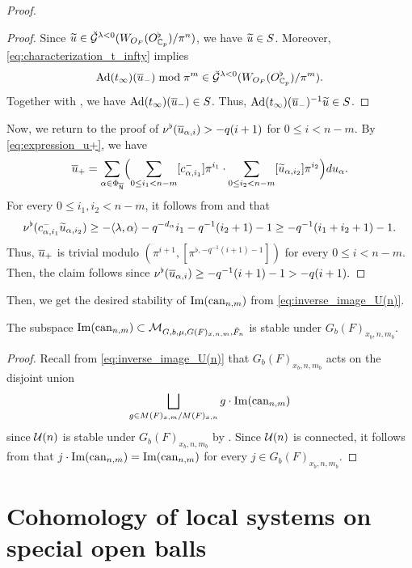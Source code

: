 \documentclass[12pt,reqno]{amsart}
\begin{document}
\begin{proof}
\begin{proof}
    Since ${\widetilde{u}} \in {\mathcal{\breve{G}}}^{\lambda < 0}(W_{O_F}(O_{\mathbb{C}_p}^\flat) / \pi^n)$, we have ${\widetilde{u}} \in S$. Moreover, \eqref{eq:characterization_t_infty} implies 
    \[
        {\operatorname{Ad}}(t_\infty)({\overline{u}}_-) \bmod \pi^m \in \breve{{\mathcal{G}}}^{\lambda < 0}(W_{O_F}(O_{\mathbb{C}_p}^\flat) / \pi^m). 
    \]
    Together with , we have ${\operatorname{Ad}}(t_\infty)({\overline{u}}_-) \in S$. Thus, ${\operatorname{Ad}}(t_\infty)({\overline{u}}_-)^{-1} {\widetilde{u}} \in S$. 
\end{proof}

    Now, we return to the proof of $\nu^\flat({\overline{u}}_{\alpha, i}) > -q(i+1)$ for $0 \leq i < n - m$. 
    By \eqref{eq:expression_u+}, we have    
    \[
        {\overline{u}}_+ = \sum_{\alpha \in \Phi_{{\mathsf{{\overline{N}}}}}} \Bigl(\sum_{0 \leq i_1 < n - m} [c_{\alpha, i_1}^{-}] \pi^{i_1} \cdot \sum_{0 \leq i_2 < n-m} [{\widetilde{u}}_{\alpha, i_2}]\pi^{i_2}\Bigr) du_\alpha. 
    \]
    For every $0 \leq i_1, i_2 < n-m$, it follows from  and  that 
    \[
        \nu^\flat(c_{\alpha, i_1}^- {\widetilde{u}}_{\alpha, i_2}) \geq - \langle \lambda, \alpha \rangle - q^{-d_\alpha} i_1 - q^{-1}(i_2 +1) - 1 \geq - q^{-1} (i_1 + i_2 + 1) - 1. 
    \]
    Thus, ${\overline{u}}_+$ is trivial modulo $(\pi^{i+1}, [\pi^{\flat, - q^{-1}(i + 1) -1}])$ for every $0 \leq i < n - m$. Then, the claim follows since
    $
        \nu^\flat({\overline{u}}_{\alpha,i}) \geq - q^{-1}(i + 1) -1 > -q(i+1). 
    $
\end{proof}


Then, we get the desired stability of ${\operatorname{Im}}({\operatorname{can}}_{n, m})$ from \eqref{eq:inverse_image_U(n)}. 


\begin{cor} \label{cor:stability_Img_can_nm}
    The subspace ${\operatorname{Im}}({\operatorname{can}}_{n, m}) \subset {\mathcal{M}}_{G, b, \mu, G(F)_{x, n, m}, \breve{F}_n}$ is stable under $G_b(F)_{x_b, n, m_b}$. 
\end{cor}
\begin{proof}
    Recall from \eqref{eq:inverse_image_U(n)} that $G_b(F)_{x_b, n, m_b}$ acts on the disjoint union 
    \[
        \bigsqcup_{g \in M(F)_{x, m} / M(F)_{x, n}} g \cdot {\operatorname{Im}}({\operatorname{can}}_{n, m})
    \]
    since ${\mathcal{U}}(n)$ is stable under $G_b(F)_{x_b, n, m_b}$ by . Since ${\mathcal{U}}(n)$ is connected, it follows from  that $j \cdot {\operatorname{Im}}({\operatorname{can}}_{n, m}) = {\operatorname{Im}}({\operatorname{can}}_{n, m})$ for every $j \in G_b(F)_{x_b, n, m_b}$. 
\end{proof}

\section{Cohomology of local systems on special open balls} \label{sec:cohomology_computation}
\end{document}
